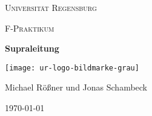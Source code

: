 \begin{titlepage}
	\centering
	{\scshape \LARGE Universität Regensburg \par}
	\vspace{1cm}
	{\scshape\Large F-Praktikum\par}
	\vspace{1.5cm}
	{\huge\bfseries Supraleitung\par}
	\vspace{2cm}
	\texttt{[image: ur-logo-bildmarke-grau]}\par
	\vfill
	{\large Michael Rößner und Jonas Schambeck\par}

	\vfill

	{\large \today\par}
\end{titlepage}
